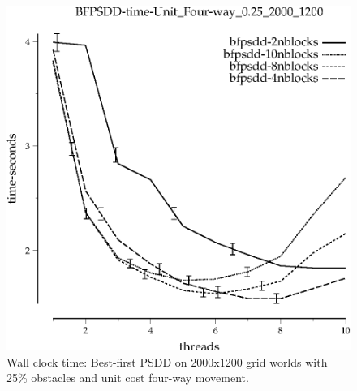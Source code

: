 \documentclass{article}
\begin{document}
\begin{appendices}
\begin{figure}[h]
\begin{center}
\includegraphics{../graphs/grid_unit_four-way_0.25_2000_1200/BFPSDD-time-Unit_Four-way_0.25_2000_1200.eps}
\caption{Wall clock time: Best-first PSDD on 2000x1200 grid worlds with 25\%
  obstacles and unit cost four-way movement.}
\end{center}
\end{figure}


\end{appendices}
\end{document}
